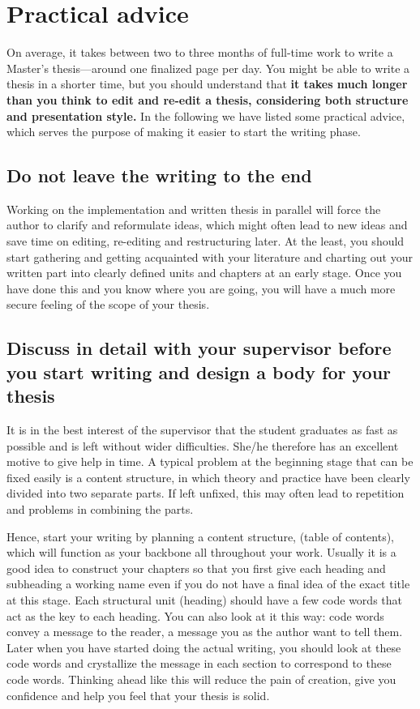\section{Practical advice}

On average, it takes between two to three months of full-time work to
write a Master’s thesis---around one finalized page per day. You
might be able to write a thesis in a shorter time, but you should
understand that \textbf{it takes much longer than you think to edit
  and re-edit a thesis, considering both structure and presentation
style.} In the following we have listed some practical advice, which
serves the purpose of making it easier to start the writing phase.

\subsection{Do not leave the writing to the end}

Working on the implementation and written thesis in parallel will
force the author to clarify and reformulate ideas, which might often
lead to new ideas and save time on editing, re-editing and
restructuring later. At the least, you should start gathering and
getting acquainted with your literature and charting out your written
part into clearly defined units and chapters at an early stage. Once
you have done this and you know where you are going, you will have a
much more secure feeling of the scope of your thesis.

\subsection{Discuss in detail with your supervisor before you start
  writing and design a
body for your thesis}

It is in the best interest of the supervisor that the student
graduates as fast as possible and is left without wider difficulties.
She/he therefore has an excellent motive to give help in time. A
typical problem at the beginning stage that can be fixed easily is a
content structure, in which theory and practice have been clearly
divided into two separate parts. If left unfixed, this may often lead
to repetition and problems in combining the parts.

Hence, start your writing by planning a content structure, (table of
contents), which will function as your backbone all throughout your
work. Usually it is a good idea to construct your chapters so that
you first give each heading and subheading a working name even if you
do not have a final idea of the exact title at this stage. Each
structural unit (heading) should have a few code words that act as
the key to each heading. You can also look at it this way: code words
convey a message to the reader, a message you as the author want to
tell them. Later when you have started doing the actual writing, you
should look at these code words and crystallize the message in each
section to correspond to these code words. Thinking ahead like this
will reduce the pain of creation, give you confidence and help you
feel that your thesis is solid.

